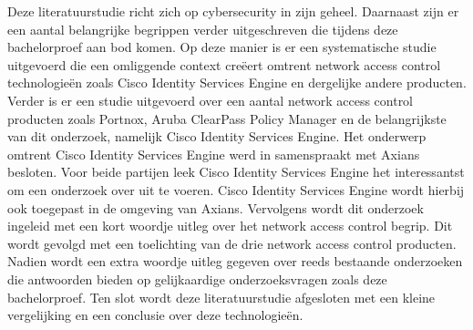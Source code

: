 Deze literatuurstudie richt zich op cybersecurity in zijn geheel. Daarnaast zijn er een aantal belangrijke begrippen verder uitgeschreven die tijdens deze bachelorproef aan bod komen. Op deze manier is er een systematische studie uitgevoerd die een omliggende context creëert omtrent network access control technologieën zoals Cisco Identity Services Engine en dergelijke andere producten. 
\newline
\newline
Verder is er een studie uitgevoerd over een aantal network access control producten zoals Portnox, Aruba ClearPass Policy Manager en de belangrijkste van dit onderzoek, namelijk Cisco Identity Services Engine. Het onderwerp omtrent Cisco Identity Services Engine werd in samenspraakt met Axians besloten. Voor beide partijen leek Cisco Identity Services Engine het interessantst om een onderzoek over uit te voeren. Cisco Identity Services Engine wordt hierbij ook toegepast in de omgeving van Axians. Vervolgens wordt dit onderzoek ingeleid met een kort woordje uitleg over het network access control begrip. 
\newline
\newline
Dit wordt gevolgd met een toelichting van de drie network access control producten. Nadien wordt een extra woordje uitleg gegeven over reeds bestaande onderzoeken die antwoorden bieden op gelijkaardige onderzoeksvragen zoals deze bachelorproef.
\newline
\newline
Ten slot wordt deze literatuurstudie afgesloten met een kleine vergelijking en een conclusie over deze technologieën. 

\newpage

